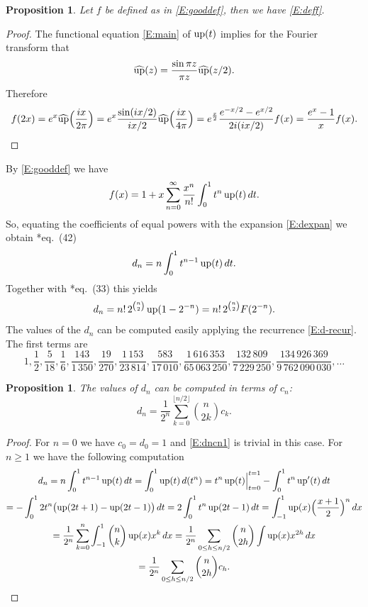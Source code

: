 \documentclass[10pt]{amsart}
\newtheorem{prop}[thm]{Proposition}
\theoremstyle{definition}
\theoremstyle{remark}
\begin{document}
\begin{prop}
Let $f$ be defined as in \eqref{E:gooddef}, then we have \eqref{E:deff}.
\end{prop}

\begin{proof}
The functional equation \eqref{E:main} of $\operatorname{up}(t)$ implies for the Fourier transform that
\[\widehat{\operatorname{up}}(z)=\frac{\sin\pi z}{\pi z}\widehat{\operatorname{up}}(z/2).\]
Therefore
\[f(2x)=e^{x}\widehat{\operatorname{up}}
\Bigl(\frac{ix}{2\pi}\Bigr)=e^{x}\frac{\sin(ix/2)}{ix/2}\widehat{\operatorname{up}}
\Bigl(\frac{ix}{4\pi}\Bigr)=e^{\frac{x}{2}}\frac{e^{-x/2}-e^{x/2}}{2i(ix/2)}f(x)
=\frac{e^x-1}{x}f(x).\]
\end{proof}

By \eqref{E:gooddef} we have
\[f(x)=1+x\sum_{n=0}^\infty\frac{x^n}{n!}\int_0^1 t^n\operatorname{up}(t)\,dt.\]
So, equating the coefficients of equal powers with the expansion \eqref{E:dexpan}
we obtain
\cite{MR666839}*{eq.~(42)}
\begin{equation}\label{E:dnint}
d_n=n\int_0^1t^{n-1}\operatorname{up}(t)\,dt.
\end{equation}
Together with \cite{MR666839}*{eq.~(33)} this yields
\begin{equation}\label{E:d-n}
d_n=n!\,2^{\binom{n}{2}}\operatorname{up}(1-2^{-n})=n!\,2^{\binom{n}{2}}F(2^{-n}).
\end{equation}
The values of the $d_n$ can be computed easily applying the recurrence \eqref{E:d-recur}.
The first terms are
\[1,\frac{1}{2},\frac{5}{18},\frac{1}{6},\frac{143}{1\,350},\frac{19}{270},
\frac{1\,153}{23\,814},\frac{583}{17\,010},\frac{1\,616\,353}{65\,063\,250},
\frac{132\,809}{7\,229\,250},
\frac{134\,926\,369}{9\,762\,090\,030},\dots\]

\begin{prop}
The values of  $d_n$ can be computed in terms of  $c_n$:
\begin{equation}\label{E:dncn1}
d_n=\frac{1}{2^n}\sum_{k=0}^{\lfloor n/2\rfloor}\binom{n}{2k}c_k.
\end{equation}
\end{prop}
\begin{proof}
For $n=0$ we have $c_0=d_0=1$ and \eqref{E:dncn1} is trivial in this case.
For $n\ge1$ we have the following computation
\begin{multline*}
d_n=n\int_0^1 t^{n-1}\operatorname{up}(t)\,dt=\int_0^1\operatorname{up}(t)\,d(t^n)=\Bigl.
t^n\operatorname{up}(t)\Bigr|_{t=0}^{t=1}-\int_0^1t^n\operatorname{up}'(t)\,dt\\
=
-\int_0^12t^n\bigl(\operatorname{up}(2t+1)-\operatorname{up}(2t-1)\bigr)\,dt=2\int_0^1 t^n\operatorname{up}(2t-1)\,dt
=\int_{-1}^1\operatorname{up}(x)\Bigl(\frac{x+1}{2}\Bigr)^n\,dx\\
=
\frac{1}{2^n}\sum_{k=0}^n\int_{-1}^1\binom{n}{k}\operatorname{up}(x)x^k\,dx=
\frac{1}{2^n}\sum_{0\le h\le n/2}\binom{n}{2h}\int\operatorname{up}(x)x^{2h}\,dx\\=
\frac{1}{2^n}\sum_{0\le h\le n/2}\binom{n}{2h}c_h.
\end{multline*}
\end{proof}
\end{document}
